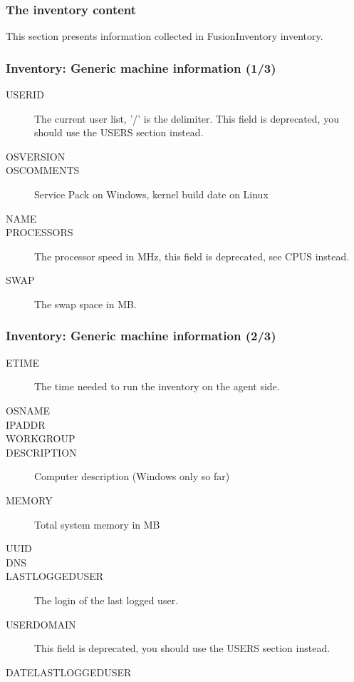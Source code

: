 \documentclass{beamer}
\begin{document}
\begin{frame}

    \frametitle{The inventory content}

This section presents information collected in FusionInventory inventory.

\end{frame}

\begin{frame}
\frametitle{Inventory: Generic machine information (1/3)}
\begin{description}
      \item[USERID] The current user list, '/' is the delimiter. This field is deprecated, you should use the USERS section instead.
      \item[OSVERSION]
      \item[OSCOMMENTS] Service Pack on Windows, kernel build date on Linux
      \item[NAME]
      \item[PROCESSORS] The processor speed in MHz, this field is deprecated, see CPUS instead.
      \item[SWAP] The swap space in MB.
\end{description}
\end{frame}
\begin{frame}
\frametitle{Inventory: Generic machine information (2/3)}
\begin{description}

      \item[ETIME] The time needed to run the inventory on the agent side.
      \item[OSNAME]
      \item[IPADDR]
      \item[WORKGROUP]
      \item[DESCRIPTION] Computer description (Windows only so far)
      \item[MEMORY] Total system memory in MB
      \item[UUID]
      \item[DNS]
      \item[LASTLOGGEDUSER] The login of the last logged user.
      \item[USERDOMAIN] This field is deprecated, you should use the USERS section instead.
      \item[DATELASTLOGGEDUSER]
\end{description}
\end{frame}
\end{document}
